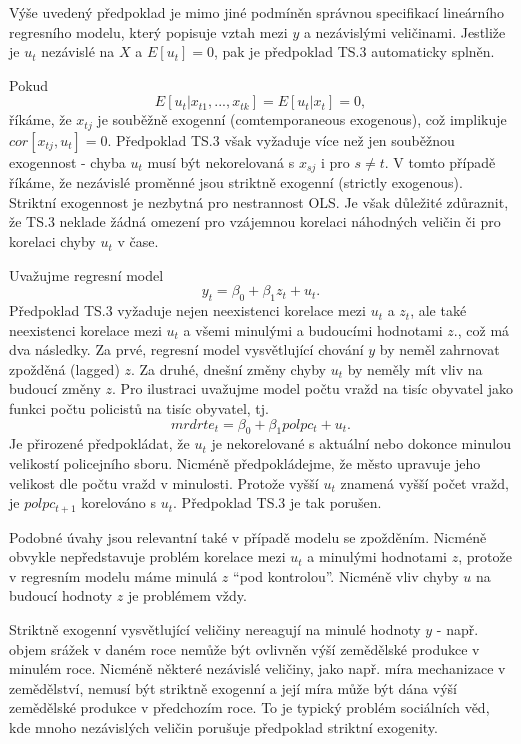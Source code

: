 Výše uvedený předpoklad je mimo jiné podmíněn správnou 
specifikací lineárního regresního modelu, který popisuje vztah mezi 
$y$ a nezávislými veličinami. Jestliže je $u_t$ nezávislé na 
$X$ a $E[u_t] = 0$, pak je předpoklad TS.3 automaticky splněn.

Pokud
\begin{equation}
E[u_t|x_{t1}, ..., x_{tk}] = E[u_t | x_t] = 0,
\end{equation}
říkáme, že $x_{tj}$ je souběžně exogenní (comtemporaneous 
exogenous), což implikuje $cor[x_{tj}, u_t] = 0$. Předpoklad TS.3 
však vyžaduje více než jen souběžnou exogennost - chyba $u_t$ 
musí být nekorelovaná s $x_{sj}$ i pro $s \ne t$. V tomto případě 
říkáme, že nezávislé proměnné jsou striktně exogenní (strictly exogenous). 
Striktní exogennost je nezbytná pro nestrannost OLS. Je však 
důležité zdůraznit, že TS.3 neklade žádná omezení pro 
vzájemnou korelaci náhodných veličin či pro korelaci chyby $u_t$ v 
čase.

Uvažujme regresní model
\begin{equation}
y_t = \beta_0 + \beta_1 z_t + u_t.
\end{equation}
Předpoklad TS.3 vyžaduje nejen neexistenci korelace mezi $u_t$ a 
$z_t$, ale také neexistenci korelace mezi $u_t$ a všemi minulými a 
budoucími hodnotami $z$., což má dva následky. Za prvé, 
regresní model vysvětlující chování $y$ by neměl zahrnovat 
zpožděná (lagged) $z$. Za druhé, dnešní změny chyby $u_t$ by 
neměly mít vliv na budoucí změny $z$. Pro ilustraci uvažujme model 
počtu vražd na tisíc obyvatel jako funkci počtu policistů na 
tisíc obyvatel, tj.
\begin{equation}
mrdrte_t = \beta_0 + \beta_1 polpc_t + u_t.
\end{equation}
Je přirozené předpokládat, že $u_t$ je nekorelované s aktuální 
nebo dokonce minulou velikostí policejního sboru. Nicméně 
předpokládejme, že město upravuje jeho velikost dle počtu vražd v 
minulosti. Protože vyšší $u_t$ znamená vyšší počet vražd, je 
$polpc_{t + 1}$ korelováno s $u_t$. Předpoklad TS.3 je tak porušen.

Podobné úvahy jsou relevantní také v případě modelu se zpožděním. 
Nicméně obvykle nepředstavuje problém korelace mezi $u_t$ a 
minulými hodnotami $z$, protože v regresním modelu máme minulá $z$ 
``pod kontrolou''. Nicméně vliv chyby $u$ na budoucí hodnoty $z$ je 
problémem vždy.

Striktně exogenní vysvětlující veličiny nereagují na minulé hodnoty $y$ - např. objem srážek v daném roce 
nemůže být ovlivněn výší zemědělské produkce v minulém roce. 
Nicméně některé nezávislé veličiny, jako např. míra 
mechanizace v zemědělství, nemusí být striktně exogenní a její 
míra může být dána výší zemědělské produkce v předchozím roce.
To je typický problém sociálních věd, kde mnoho nezávislých veličin 
porušuje předpoklad striktní exogenity.

